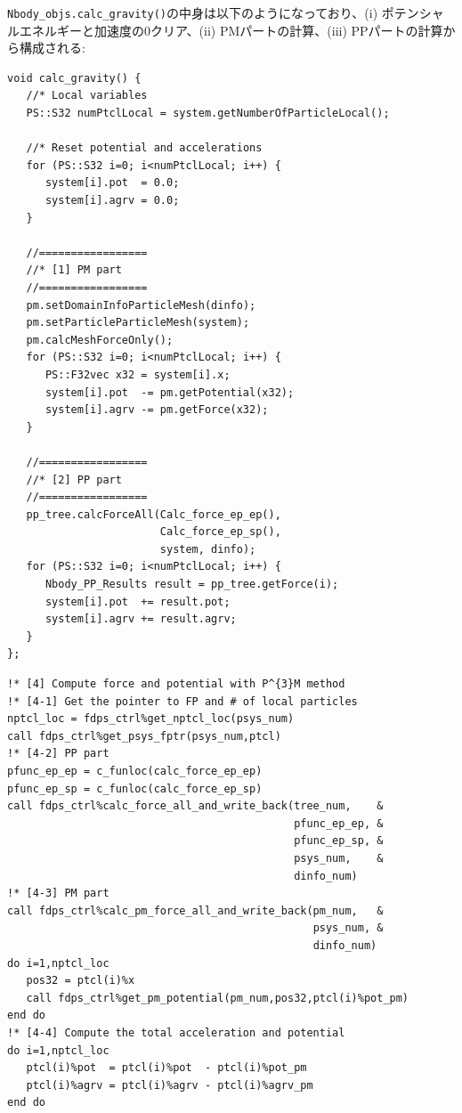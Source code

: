 \texttt{Nbody\_objs.calc\_gravity()}の中身は以下のようになっており、(i) ポテンシャルエネルギーと加速度の0クリア、(ii) PMパートの計算、(iii) PPパートの計算から構成される:
\begin{lstlisting}[caption=相互作用計算の中身]
void calc_gravity() {
   //* Local variables
   PS::S32 numPtclLocal = system.getNumberOfParticleLocal();

   //* Reset potential and accelerations
   for (PS::S32 i=0; i<numPtclLocal; i++) {
      system[i].pot  = 0.0;
      system[i].agrv = 0.0;
   }

   //=================
   //* [1] PM part 
   //=================
   pm.setDomainInfoParticleMesh(dinfo);
   pm.setParticleParticleMesh(system);
   pm.calcMeshForceOnly();
   for (PS::S32 i=0; i<numPtclLocal; i++) {
      PS::F32vec x32 = system[i].x;
      system[i].pot  -= pm.getPotential(x32);
      system[i].agrv -= pm.getForce(x32);
   }

   //=================                                                                   
   //* [2] PP part                                                                           
   //=================                                                                   
   pp_tree.calcForceAll(Calc_force_ep_ep(),                                              
                        Calc_force_ep_sp(),                                              
                        system, dinfo);                                                  
   for (PS::S32 i=0; i<numPtclLocal; i++) {                                              
      Nbody_PP_Results result = pp_tree.getForce(i);                                     
      system[i].pot  += result.pot;                                                      
      system[i].agrv += result.agrv;                                                     
   }
};
\end{lstlisting}
\endifCpp
\ifFtn
\begin{lstlisting}[caption=相互作用計算の実行]
!* [4] Compute force and potential with P^{3}M method
!* [4-1] Get the pointer to FP and # of local particles
nptcl_loc = fdps_ctrl%get_nptcl_loc(psys_num)
call fdps_ctrl%get_psys_fptr(psys_num,ptcl)
!* [4-2] PP part
pfunc_ep_ep = c_funloc(calc_force_ep_ep)
pfunc_ep_sp = c_funloc(calc_force_ep_sp)
call fdps_ctrl%calc_force_all_and_write_back(tree_num,    &
                                             pfunc_ep_ep, &
                                             pfunc_ep_sp, &
                                             psys_num,    &
                                             dinfo_num)
!* [4-3] PM part
call fdps_ctrl%calc_pm_force_all_and_write_back(pm_num,   &
                                                psys_num, &
                                                dinfo_num)
do i=1,nptcl_loc
   pos32 = ptcl(i)%x
   call fdps_ctrl%get_pm_potential(pm_num,pos32,ptcl(i)%pot_pm)
end do
!* [4-4] Compute the total acceleration and potential
do i=1,nptcl_loc
   ptcl(i)%pot  = ptcl(i)%pot  - ptcl(i)%pot_pm
   ptcl(i)%agrv = ptcl(i)%agrv - ptcl(i)%agrv_pm
end do
\end{lstlisting}
